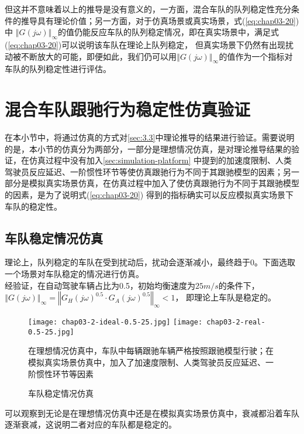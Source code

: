 但这并不意味着以上的推导是没有意义的，一方面，混合车队的队列稳定性充分条件的推导具有理论价值；另一方面，对于仿真场景或真实场景，式(\ref{eq:chap03-20})中
$\left\Vert G(j\omega) \right\Vert_{\infty}$的值仍能反应车队的队列稳定情况，即在真实场景中，满足式(\ref{eq:chap03-20})可以说明该车队在理论上队列稳定，
但真实场景下仍然有出现扰动被不断放大的可能，即便如此，我们仍可以用$\left\Vert G(j\omega) \right\Vert_{\infty}$的值作为一个指标对车队的队列稳定性进行评估。


\section{混合车队跟驰行为稳定性仿真验证}

在本小节中，将通过仿真的方式对\ref{sec:3.3}中理论推导的结果进行验证。需要说明的是，本小节的仿真分为两部分，一部分是理想情况仿真，是对理论推导结果的验证，在仿真过程中没有加入\ref{sec:simulation-platform}
中提到的加速度限制、人类驾驶员反应延迟、一阶惯性环节等使仿真跟驰行为不同于其跟驰模型的因素；另一部分是模拟真实场景仿真，在仿真过程中加入了使仿真跟驰行为不同于其跟驰模型的因素，是为了说明式(\ref{eq:chap03-20})
得到的指标确实可以反应模拟真实场景下车队的稳定性。

\subsection{车队稳定情况仿真}

理论上，队列稳定的车队在受到扰动后，扰动会逐渐减小，最终趋于0。下面选取一个场景对车队稳定的情况进行仿真。\\

经验证，在自动驾驶车辆占比为0.5，初始均衡速度为$25m/s$的条件下，$\left\Vert G(j\omega) \right\Vert_{\infty} = \left\Vert G_H(j\omega)^{0.5} \cdot G_A(j\omega)^{0.5} \right\Vert_{\infty} < 1$，
即理论上车队是稳定的。

\begin{figure}
  \centering
    {\texttt{[image: chap03-2-ideal-0.5-25.jpg]}}
    {\texttt{[image: chap03-2-real-0.5-25.jpg]}}
    \caption*{在理想情况仿真中，车队中每辆跟驰车辆严格按照跟驰模型行驶；在模拟真实场景仿真中，加入了加速度限制、人类驾驶员反应延迟、一阶惯性环节等因素}
    \caption{车队稳定情况仿真}
  \label{fig:chap03-2}
\end{figure}

可以观察到无论是在理想情况仿真中还是在模拟真实场景仿真中，衰减都沿着车队逐渐衰减，这说明二者对应的车队都是稳定的。

